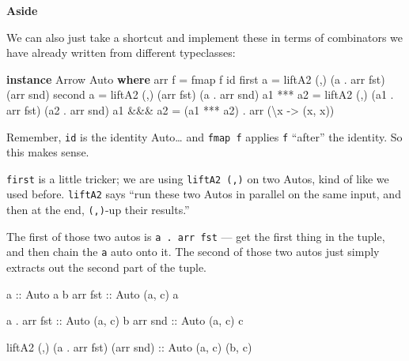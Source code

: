 \documentclass[]{article}
\newenvironment{Shaded}{}{}
\newcommand{\DataTypeTok}[1]{\textcolor[rgb]{0.56,0.13,0.00}{#1}}
\newcommand{\FunctionTok}[1]{\textcolor[rgb]{0.02,0.16,0.49}{#1}}
\newcommand{\KeywordTok}[1]{\textcolor[rgb]{0.00,0.44,0.13}{\textbf{#1}}}
\newcommand{\NormalTok}[1]{#1}
\newcommand{\OtherTok}[1]{\textcolor[rgb]{0.00,0.44,0.13}{#1}}
\begin{document}
\textbf{Aside}

We can also just take a shortcut and implement these in terms of combinators we
have already written from different typeclasses:

\begin{Shaded}
\begin{Highlighting}[]
\KeywordTok{instance} \DataTypeTok{Arrow} \DataTypeTok{Auto} \KeywordTok{where}
\NormalTok{    arr f     }\FunctionTok{=}\NormalTok{ fmap f id}
\NormalTok{    first a   }\FunctionTok{=}\NormalTok{ liftA2 (,) (a  }\FunctionTok{.}\NormalTok{ arr fst) (arr snd)}
\NormalTok{    second a  }\FunctionTok{=}\NormalTok{ liftA2 (,) (arr fst)      (a  }\FunctionTok{.}\NormalTok{ arr snd)}
\NormalTok{    a1 }\FunctionTok{***}\NormalTok{ a2 }\FunctionTok{=}\NormalTok{ liftA2 (,) (a1 }\FunctionTok{.}\NormalTok{ arr fst) (a2 }\FunctionTok{.}\NormalTok{ arr snd)}
\NormalTok{    a1 }\FunctionTok{&&&}\NormalTok{ a2 }\FunctionTok{=}\NormalTok{ (a1 }\FunctionTok{***}\NormalTok{ a2) }\FunctionTok{.}\NormalTok{ arr (\textbackslash{}x }\OtherTok{->}\NormalTok{ (x, x))}
\end{Highlighting}
\end{Shaded}

Remember, \texttt{id} is the identity Auto\ldots{} and \texttt{fmap\ f} applies
\texttt{f} ``after'' the identity. So this makes sense.

\texttt{first} is a little tricker; we are using \texttt{liftA2\ (,)} on two
Autos, kind of like we used before. \texttt{liftA2} says ``run these two Autos
in parallel on the same input, and then at the end, \texttt{(,)}-up their
results.''

The first of those two autos is \texttt{a\ .\ arr\ fst} --- get the first thing
in the tuple, and then chain the \texttt{a} auto onto it. The second of those
two autos just simply extracts out the second part of the tuple.

\begin{Shaded}
\begin{Highlighting}[]
\OtherTok{a           ::} \DataTypeTok{Auto}\NormalTok{ a b}
\NormalTok{arr}\OtherTok{ fst     ::} \DataTypeTok{Auto}\NormalTok{ (a, c) a}

\NormalTok{a }\FunctionTok{.}\NormalTok{ arr}\OtherTok{ fst ::} \DataTypeTok{Auto}\NormalTok{ (a, c) b}
\NormalTok{arr}\OtherTok{ snd     ::} \DataTypeTok{Auto}\NormalTok{ (a, c) c}

\NormalTok{liftA2 (,) (a }\FunctionTok{.}\NormalTok{ arr fst) (arr snd)}\OtherTok{ ::} \DataTypeTok{Auto}\NormalTok{ (a, c) (b, c)}
\end{Highlighting}
\end{Shaded}
\end{document}

